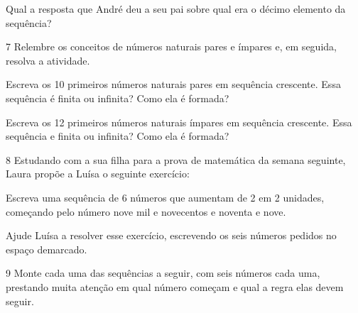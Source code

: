 Qual a resposta que André deu a seu pai sobre qual era o décimo elemento da sequência?


\num{7} Relembre os conceitos de números naturais pares e ímpares e, em
seguida, resolva a atividade.

\begin{escolha}
\item
  Escreva os 10 primeiros números naturais pares em sequência crescente.
  Essa sequência é finita ou infinita? Como ela é formada?\\

\item
  Escreva os 12 primeiros números naturais ímpares em sequência
  crescente. Essa sequência e finita ou infinita? Como ela é formada?\\
\end{escolha}

\pagebreak
\num{8} Estudando com a sua filha para a prova de matemática da semana
seguinte, Laura propõe a Luísa o seguinte exercício:

\begin{mdframed}[linewidth=2pt,linecolor=salmao,backgroundcolor=salmao!20]
Escreva uma sequência de 6 números que aumentam de 2 em 2 unidades,
começando pelo número nove mil e novecentos e noventa e nove.
\end{mdframed}

Ajude Luísa a resolver esse exercício, escrevendo os seis números pedidos no espaço demarcado.


\num{9} Monte cada uma das sequências a seguir, com seis números cada uma,
prestando muita atenção em qual número começam e qual a regra elas devem
seguir.

